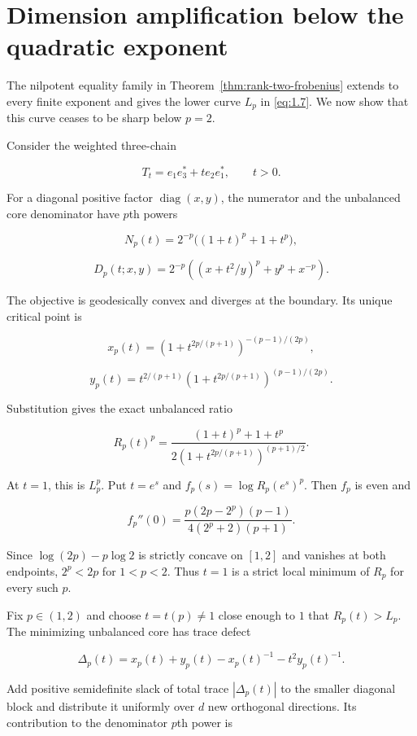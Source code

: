 \documentclass[11pt]{article}
\begin{document}
\section{Dimension amplification below the quadratic exponent}


The nilpotent equality family in Theorem~\ref{thm:rank-two-frobenius} extends to every finite exponent
and gives the lower curve $L_p$ in \eqref{eq:1.7}. We now show that this curve ceases to
be sharp below $p=2$.

Consider the weighted three-chain

\[
T_t=e_1e_3^*+t e_2e_1^*,\qquad t>0.
\tag{7.1}\label{eq:7.1}
\]

For a diagonal positive factor $\operatorname{diag}(x,y)$, the numerator and
the unbalanced core denominator have $p$th powers

\[
N_p(t)=2^{-p}\bigl((1+t)^p+1+t^p\bigr),
\tag{7.2}\label{eq:7.2}
\]

\[
D_p(t;x,y)=2^{-p}\left((x+t^2/y)^p+y^p+x^{-p}\right).
\tag{7.3}\label{eq:7.3}
\]

The objective is geodesically convex and diverges at the boundary. Its unique
critical point is

\[
x_p(t)=(1+t^{2p/(p+1)})^{-(p-1)/(2p)},
\tag{7.4}\label{eq:7.4}
\]

\[
y_p(t)=t^{2/(p+1)}
(1+t^{2p/(p+1)})^{(p-1)/(2p)}.
\tag{7.5}\label{eq:7.5}
\]

Substitution gives the exact unbalanced ratio

\[
R_p(t)^p=
\frac{(1+t)^p+1+t^p}
{2(1+t^{2p/(p+1)})^{(p+1)/2}}.
\tag{7.6}\label{eq:7.6}
\]

At $t=1$, this is $L_p^p$. Put $t=e^s$ and
$f_p(s)=\log R_p(e^s)^p$. Then $f_p$ is even and

\[
f_p''(0)=
\frac{p(2p-2^p)(p-1)}
{4(2^p+2)(p+1)}.
\tag{7.7}\label{eq:7.7}
\]

Since $\log(2p)-p\log2$ is strictly concave on $[1,2]$ and vanishes at both
endpoints, $2^p<2p$ for $1<p<2$. Thus $t=1$ is a strict local minimum of
$R_p$ for every such $p$.

Fix $p\in(1,2)$ and choose $t=t(p)\ne1$ close enough to $1$ that
$R_p(t)>L_p$. The minimizing unbalanced core has trace defect

\[
\Delta_p(t)=x_p(t)+y_p(t)-x_p(t)^{-1}-t^2y_p(t)^{-1}.
\tag{7.8}\label{eq:7.8}
\]

Add positive semidefinite slack of total trace $|\Delta_p(t)|$ to the smaller
diagonal block and distribute it uniformly over $d$ new orthogonal directions.
Its contribution to the denominator $p$th power is
\end{document}

